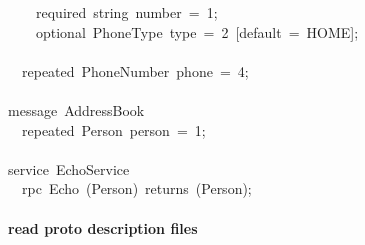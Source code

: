 \documentclass[10pt,twocolumn,a4paper]{article}
\newenvironment{Houtput}%
{}%
{}%
\newcommand{\hlstd}[1]{\textcolor[rgb]{0,0,0}{#1}}%
\begin{document}
\begin{Houtput}
\hlstd{}{\ }{\ }{\ }{\ }required{\ }string{\ }number{\ }={\ }1;\hspace*{\fill}\\
\hlstd{}{\ }{\ }{\ }{\ }optional{\ }PhoneType{\ }type{\ }={\ }2{\ }[default{\ }={\ }HOME];\hspace*{\fill}\\
\hlstd{}{\ }{\ }\usebox{\hlnormalsizeboxclosebrace}\hspace*{\fill}\\
\hlstd{}{\ }{\ }repeated{\ }PhoneNumber{\ }phone{\ }={\ }4;\hspace*{\fill}\\
\hlstd{}\usebox{\hlnormalsizeboxclosebrace}\hspace*{\fill}\\
\hlstd{}message{\ }AddressBook{\ }\usebox{\hlnormalsizeboxopenbrace}\hspace*{\fill}\\
\hlstd{}{\ }{\ }repeated{\ }Person{\ }person{\ }={\ }1;\hspace*{\fill}\\
\hlstd{}\usebox{\hlnormalsizeboxclosebrace}\hspace*{\fill}\\
\hlstd{}service{\ }EchoService{\ }\usebox{\hlnormalsizeboxopenbrace}\hspace*{\fill}\\
\hlstd{}{\ }{\ }rpc{\ }Echo{\ }(Person){\ }returns{\ }(Person);\hspace*{\fill}\\
\hlstd{}\usebox{\hlnormalsizeboxclosebrace}\hspace*{\fill}\hlstd{}\mbox{}
\normalfont

\end{Houtput}

\paragraph{read proto description files}
\end{document}
